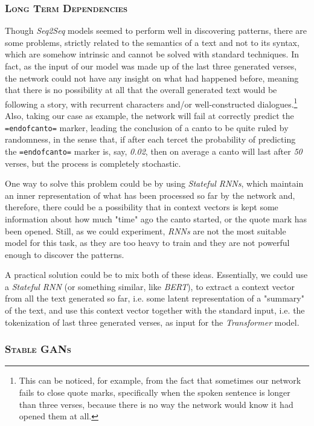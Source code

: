 \subsubsection{\textsc{Long Term Dependencies}}

Though \textit{Seq2Seq} models seemed to perform well in discovering patterns, there are some problems, strictly related to the semantics of a text and not to its syntax, which are somehow intrinsic and cannot be solved with standard techniques.
In fact, as the input of our model was made up of the last three generated verses, the network could not have any insight on what had happened before, meaning that there is no possibility at all that the overall generated text would be following a story, with recurrent characters and/or well-constructed dialogues.\footnote{
    This can be noticed, for example, from the fact that sometimes our network fails to close quote marks, specifically when the spoken sentence is longer than three verses, because there is no way the network would know it had opened them at all.
}
Also, taking our case as example, the network will fail at correctly predict the \texttt{=endofcanto=} marker, leading the conclusion of a canto to be quite ruled by randomness, in the sense that, if after each tercet the probability of predicting the \texttt{=endofcanto=} marker is, say, \textit{0.02}, then on average a canto will last after \textit{50} verses, but the process is completely stochastic.

One way to solve this problem could be by using \textit{Stateful RNNs}, which maintain an inner representation of what has been processed so far by the network and, therefore, there could be a possibility that in context vectors is kept some information about how much "time" ago the canto started, or the quote mark has been opened.
Still, as we could experiment, \textit{RNNs} are not the most suitable model for this task, as they are too heavy to train and they are not powerful enough to discover the patterns.

A practical solution could be to mix both of these ideas.
Essentially, we could use a \textit{Stateful RNN} (or something similar, like \textit{BERT}), to extract a context vector from all the text generated so far, i.e. some latent representation of a "summary" of the text, and use this context vector together with the standard input, i.e. the tokenization of last three generated verses, as input for the \textit{Transformer} model.

\subsubsection{\textsc{Stable GANs}}

